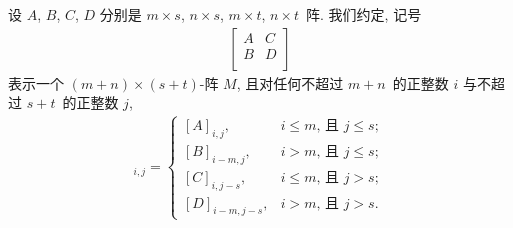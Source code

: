 \documentclass[../libro.tex]{subfiles}
\begin{document}
\begin{definition}
    设 \(A\), \(B\), \(C\), \(D\)
    分别是 \(m \times s\), \(n \times s\),
    \(m \times t\), \(n \times t\)~阵.
    我们约定, 记号
    \begin{align*}
        \begin{bmatrix}
            A & C \\
            B & D \\
        \end{bmatrix}
    \end{align*}
    表示一个 \((m + n) \times (s + t)\)-阵 \(M\),
    且对任何不超过 \(m + n\)~的正整数 \(i\)
    与不超过 \(s + t\)~的正整数 \(j\),
    \begin{align*}
        [M]_{i,j} =
        \begin{cases}
            [A]_{i,j},
            & \text{\(i \leq m\), 且 \(j \leq s\)}; \\
            [B]_{i-m,j},
            & \text{\(i > m\), 且 \(j \leq s\)};    \\
            [C]_{i,j-s},
            & \text{\(i \leq m\), 且 \(j > s\)};    \\
            [D]_{i-m,j-s},
            & \text{\(i > m\), 且 \(j > s\)}.
        \end{cases}
    \end{align*}
\end{definition}
\end{document}
